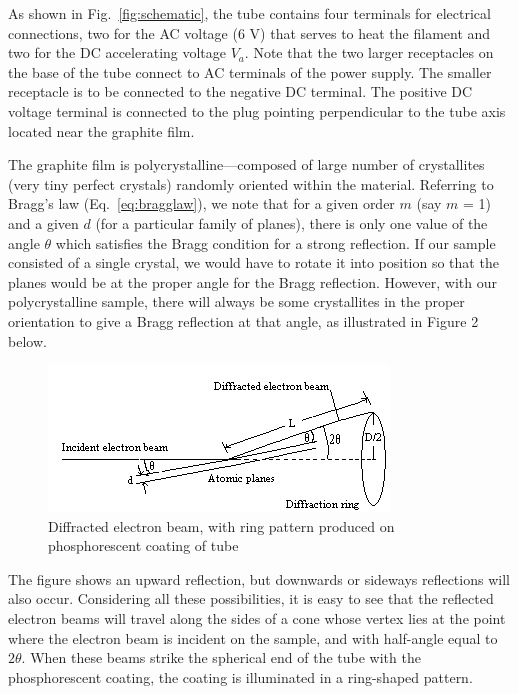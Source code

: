 \documentclass{article}
\begin{document}
As shown in Fig.~\ref{fig:schematic}, the tube contains four terminals for electrical
connections, two for the AC voltage (6 V) that serves to heat the
filament and two for the DC accelerating voltage $V_a$.
 Note that the two larger receptacles on the base of the tube connect
to AC terminals of the power supply.  The smaller receptacle is to be
connected to the negative DC terminal.  The positive DC voltage
terminal is connected to the plug pointing perpendicular to the tube
axis located near the graphite film.

The graphite film is polycrystalline---composed of large number of
crystallites (very tiny perfect crystals) randomly oriented within the
material.  Referring to Bragg's law (Eq.~\ref{eq:bragglaw}), we note
that for a given order $m$ (say $m$ = 1) and a given $d$ (for a particular
family of planes), there is only one value of the angle ${\theta}$
which satisfies the Bragg condition for a strong reflection.  If our
sample consisted of a single crystal, we would have to rotate it into
position so that the planes would be at the proper angle for the Bragg
reflection.  However, with our polycrystalline sample, there will
always be some crystallites in the proper orientation to give a Bragg
reflection at that angle, as illustrated in Figure 2 below.
\begin{figure}
\begin{centering}
\includegraphics[width=3.5634in,height=1.5311in]{images/ediffraction-img2.png}
\caption{Diffracted electron beam, with ring pattern produced on phosphorescent coating of tube}
\label{fig:rings}
\end{centering}
\end{figure}

The figure shows an upward reflection, but downwards or sideways
reflections will also occur. Considering all these possibilities, it is
easy to see that the reflected electron beams will travel along the
sides of a cone whose vertex lies at the point where the electron beam
is incident on the sample, and with half-angle equal to $2{\theta}$.
 When these beams strike the spherical end of the tube with the
phosphorescent coating, the coating is illuminated in a ring-shaped
pattern.
\end{document}

